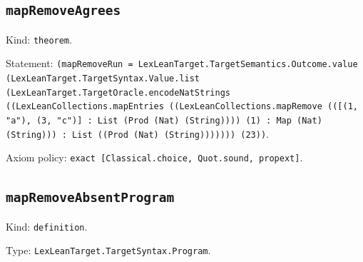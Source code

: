 \documentclass[11pt]{article}
\begin{document}
\subsection*{\texttt{mapRemoveAgrees}}
\noindent Kind: \texttt{theorem}.\par
\noindent Statement: \texttt{(mapRemoveRun = LexLeanTarget.TargetSemantics.Outcome.value (LexLeanTarget.TargetSyntax.Value.list (LexLeanTarget.TargetOracle.encodeNatStrings ((LexLeanCollections.mapEntries ((LexLeanCollections.mapRemove (([(1, "a"), (3, "c")] : List (Prod (Nat) (String)))) (1) : Map (Nat) (String))) : List ((Prod (Nat) (String))))))) (23))}.\par
\noindent Axiom policy: \texttt{exact [Classical.choice, Quot.sound, propext]}.\par
\subsection*{\texttt{mapRemoveAbsentProgram}}
\noindent Kind: \texttt{definition}.\par
\noindent Type: \texttt{LexLeanTarget.TargetSyntax.Program}.\par
\end{document}
